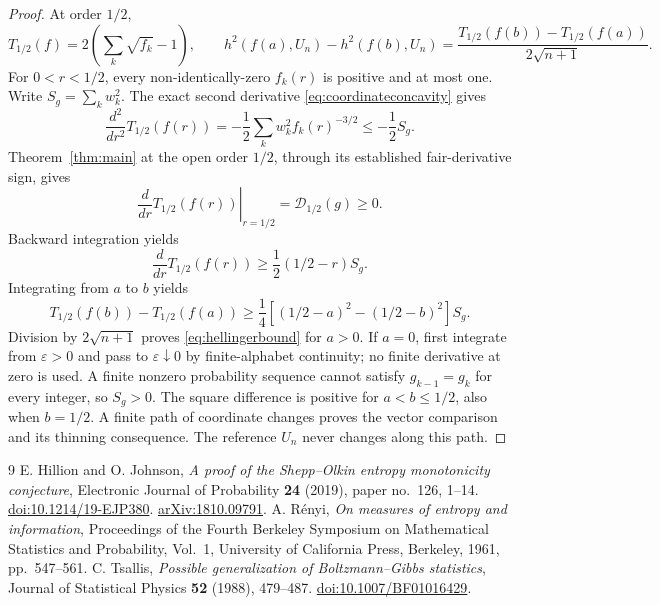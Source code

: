 \documentclass[11pt,a4paper]{amsart}
\numberwithin{equation}{section}
\theoremstyle{remark}
\newcommand{\D}{\mathscr D}
\newcommand{\eps}{\varepsilon}
\begin{document}
\begin{proof}
At order $1/2$,
\[
T_{1/2}(f)=2\left(\sum_k\sqrt{f_k}-1\right),
\qquad
h^2(f(a),U_n)-h^2(f(b),U_n)
=\frac{T_{1/2}(f(b))-T_{1/2}(f(a))}{2\sqrt{n+1}}.
\]
For $0<r<1/2$, every non-identically-zero $f_k(r)$ is positive and
at most one. Write $S_g=\sum_k w_k^2$. The exact second derivative
\eqref{eq:coordinateconcavity} gives
\[
\frac{d^2}{dr^2}T_{1/2}(f(r))
=-\frac12\sum_k w_k^2 f_k(r)^{-3/2}\le-\frac12 S_g.
\]
Theorem~\ref{thm:main} at the open order $1/2$, through its established
fair-derivative sign, gives
\[
\left.\frac d{dr}T_{1/2}(f(r))\right|_{r=1/2}
=\D_{1/2}(g)\ge0.
\]
Backward integration yields
\[
\frac d{dr}T_{1/2}(f(r))\ge\frac12(1/2-r)S_g.
\]
Integrating from $a$ to $b$ yields
\[
T_{1/2}(f(b))-T_{1/2}(f(a))
\ge\frac14[(1/2-a)^2-(1/2-b)^2]S_g.
\]
Division by $2\sqrt{n+1}$ proves \eqref{eq:hellingerbound} for $a>0$.
If $a=0$, first integrate from $\eps>0$ and pass to $\eps\downarrow0$
by finite-alphabet continuity; no finite derivative at zero is used.
A finite nonzero probability sequence cannot satisfy
$g_{k-1}=g_k$ for every integer, so $S_g>0$. The square difference is
positive for $a<b\le1/2$, also when $b=1/2$. A finite path of
coordinate changes proves the vector comparison and its thinning
consequence. The reference $U_n$ never changes along this path.
\end{proof}

\begin{thebibliography}{9}
E. Hillion and O. Johnson,
\emph{A proof of the Shepp--Olkin entropy monotonicity conjecture},
Electronic Journal of Probability \textbf{24} (2019), paper no.~126, 1--14.
\href{https://doi.org/10.1214/19-EJP380}{doi:10.1214/19-EJP380}.
\href{https://arxiv.org/abs/1810.09791}{arXiv:1810.09791}.
A. R\'enyi,
\emph{On measures of entropy and information},
Proceedings of the Fourth Berkeley Symposium on Mathematical
Statistics and Probability, Vol.~1, University of California Press,
Berkeley, 1961, pp.~547--561.
C. Tsallis,
\emph{Possible generalization of Boltzmann--Gibbs statistics},
Journal of Statistical Physics \textbf{52} (1988), 479--487.
\href{https://doi.org/10.1007/BF01016429}{doi:10.1007/BF01016429}.
\end{thebibliography}
\end{document}
